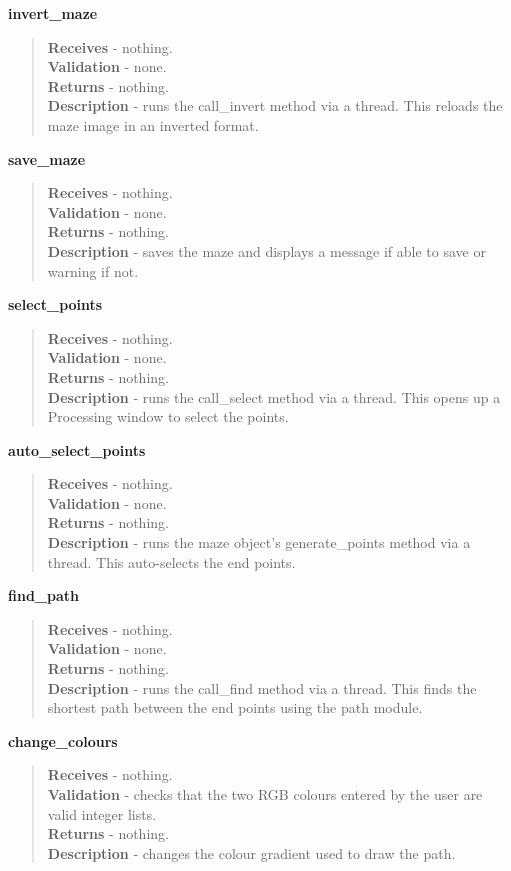 \documentclass[titlepage]{article}
\begin{document}
\textbf{invert\_maze}
\begin{quote}
\textbf{Receives} - nothing. \\
\textbf{Validation} - none.\\
\textbf{Returns} - nothing. \\
\textbf{Description} - runs the call\_invert method via a thread. This reloads the maze image in an inverted format.
\end{quote}

\textbf{save\_maze}
\begin{quote}
\textbf{Receives} - nothing. \\
\textbf{Validation} - none.\\
\textbf{Returns} - nothing. \\
\textbf{Description} - saves the maze and displays a message if able to save or warning if not.
\end{quote}

\textbf{select\_points}
\begin{quote}
\textbf{Receives} - nothing. \\
\textbf{Validation} - none.\\
\textbf{Returns} - nothing. \\
\textbf{Description} - runs the call\_select method via a thread. This opens up a Processing window to select the points.
\end{quote}

\textbf{auto\_select\_points}
\begin{quote}
\textbf{Receives} - nothing. \\
\textbf{Validation} - none.\\
\textbf{Returns} - nothing. \\
\textbf{Description} - runs the maze object's generate\_points method via a thread. This auto-selects the end points.
\end{quote}

\textbf{find\_path}
\begin{quote}
\textbf{Receives} - nothing. \\
\textbf{Validation} - none.\\
\textbf{Returns} - nothing. \\
\textbf{Description} - runs the call\_find method via a thread. This finds the shortest path between the end points using the path module.
\end{quote}

\textbf{change\_colours}
\begin{quote}
\textbf{Receives} - nothing. \\
\textbf{Validation} - checks that the two RGB colours entered by the user are valid integer lists.\\
\textbf{Returns} - nothing. \\
\textbf{Description} - changes the colour gradient used to draw the path.
\end{quote}
\end{document}
